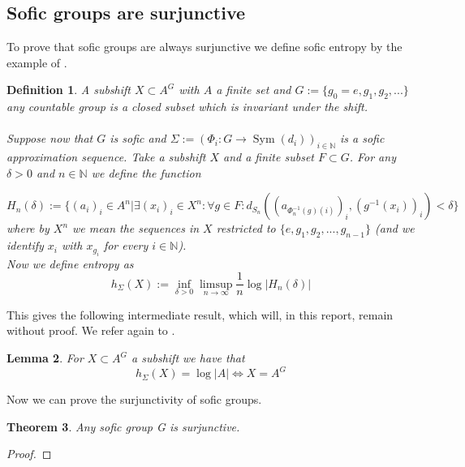 \documentclass[titlepage, a4paper]{article}
\newcommand{\N}{\mathbb{N}}
\DeclareMathOperator{\sym}{Sym}
\newtheorem{theorem}{Theorem}[section]
\newtheorem{definition}[theorem]{Definition}
\newtheorem{lemma}[theorem]{Lemma}
\theoremstyle{remark}
\begin{document}
\subsection{Sofic groups are surjunctive}

To prove that sofic groups are always surjunctive we define sofic entropy by the example of \cite{capraro_lupini_2015}.
\begin{definition}

A subshift $X \subset A^G$ with $A$ a finite set and $G := \{g_0 = e, g_1, g_2, ...\}$ any countable group is a closed subset which is invariant under the shift.\\
\\
Suppose now that $G$ is sofic and $\Sigma := (\Phi_i: G \to \sym(d_i))_{i \in \N}$ is a sofic approximation sequence. Take a subshift $X$ and a finite subset $F \subset G$. For any $\delta > 0$ and $n \in \N$ we define the function 
		
		\[
		H_n (\delta) := \{(a_i)_i \in A^n | 
						\exists (x_i)_i \in X^n : 
						\forall g \in F: d_{S_n}((a_{\Phi^{-1}_n(g)(i)})_i,(g^{-1}(x_i))_i) < \delta \}
		\]
		where by $X^n$ we mean the sequences in $X$ restricted to $\{e, g_1, g_2, ..., g_{n-1}\}$ (and we identify $x_i$ with $x_{g_i}$ for every $i \in \N$).\\
		Now we define entropy as 
		\[
		h_\Sigma(X) := \inf_{\delta>0} \limsup_{n \to \infty} \frac{1}{n} \log |H_n(\delta)|
		\]
\end{definition}

This gives the following intermediate result, which will, in this report, remain without proof. We refer again to \cite{capraro_lupini_2015}. 

\begin{lemma}
For $X \subset A^G$ a subshift we have that 
		\[
		h_\Sigma(X) = \log |A| \Leftrightarrow X = A^G
		\]
\end{lemma}

Now we can prove the surjunctivity of sofic groups.

\begin{theorem}
Any sofic group G is surjunctive.
\end{theorem}
\begin{proof}

\end{proof}
\end{document}

